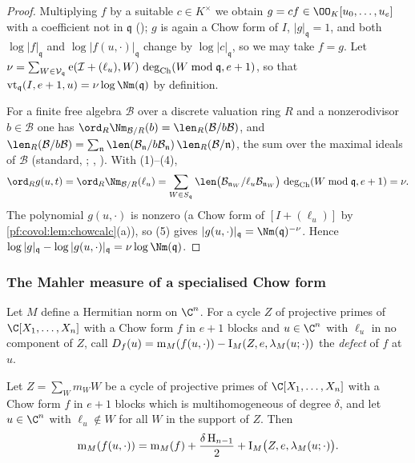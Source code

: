 \begin{proof}
Multiplying $f$ by a suitable $c\in K^\times$ we obtain $g=cf\in\OO_K[u_0,\dots,u_e]$ with a coefficient not
in $\mathfrak q$ (); $g$ is again a
Chow form of $I$, $|g|_{\mathfrak q}=1$, and both $\log|f|_{\mathfrak q}$ and
$\log|f(u,\cdot)|_{\mathfrak q}$ change by $\log|c|_{\mathfrak q}$, so we may take $f=g$. Let
$\nu=\sum_{W\in\mathcal V_{\mathfrak q}}\operatorname{e}(\mathcal I+(\ell_u),W)\,\operatorname{deg}_{\mathrm{Ch}}(W\bmod\mathfrak q,e+1)$,
so that $\covolVt_{\mathfrak q}(I,e+1,u)=\nu\log\Nm(\mathfrak q)$ by definition.

For a finite free algebra $\mathcal B$ over a discrete valuation ring $R$ and a nonzerodivisor
$b\in\mathcal B$ one has $\ord_R\Nm_{\mathcal B/R}(b)=\len_R(\mathcal B/b\mathcal B)$, and
$\len_R(\mathcal B/b\mathcal B)=\sum_{\mathfrak n}\len(\mathcal B_{\mathfrak n}/b\mathcal B_{\mathfrak n})\,
\len_R(\mathcal B/\mathfrak n)$, the sum over the maximal ideals of $\mathcal B$ (standard,
\cite[App.~A]{Fulton1998}; ,
). With (1)--(4),
\[
\ord_R g(u,t)=\ord_R\Nm_{\mathcal B/R}(\ell_u)=\sum_{W\in S_{\mathfrak q}}
\len\bigl(\mathcal B_{\mathfrak n_W}/\ell_u\mathcal B_{\mathfrak n_W}\bigr)\,\covolCdeg(W\bmod\mathfrak q,e+1)=\nu .
\]
The polynomial $g(u,\cdot)$ is nonzero (a Chow form of $[I+(\ell_u)]$ by \cref{pf:covol:lem:chowcalc}(a)),
so (5) gives $|g(u,\cdot)|_{\mathfrak q}=\Nm(\mathfrak q)^{-\nu}$. Hence
$\log|g|_{\mathfrak q}-\log|g(u,\cdot)|_{\mathfrak q}=\nu\log\Nm(\mathfrak q)$.
\end{proof}

\subsubsection*{The Mahler measure of a specialised Chow form}
Let $M$ define a Hermitian norm on $\C^n$. For a cycle $Z$ of projective primes of $\C[X_1,\dots,X_n]$ with
a Chow form $f$ in $e+1$ blocks and $u\in\C^n$ with $\ell_u$ in no component of $Z$, call
$D_f(u)=\operatorname{m}_M(f(u,\cdot))-\operatorname{I}_M(Z,e,\lambda_M(u;\cdot))$ the \emph{defect} of $f$ at $u$.

\begin{proposition}\label{pf:covol:prop:mahler}
Let $Z=\sum_Wm_WW$ be a cycle of projective primes of $\C[X_1,\dots,X_n]$ with a Chow form $f$ in $e+1$
blocks which is multihomogeneous of degree $\delta$, and let $u\in\C^n$ with $\ell_u\notin W$ for all $W$ in
the support of $Z$. Then
\[
\operatorname{m}_M(f(u,\cdot))=\operatorname{m}_M(f)+\frac{\delta\,\mathrm{H}_{n-1}}2+
\operatorname{I}_M\bigl(Z,e,\lambda_M(u;\cdot)\bigr).
\]
\end{proposition}

